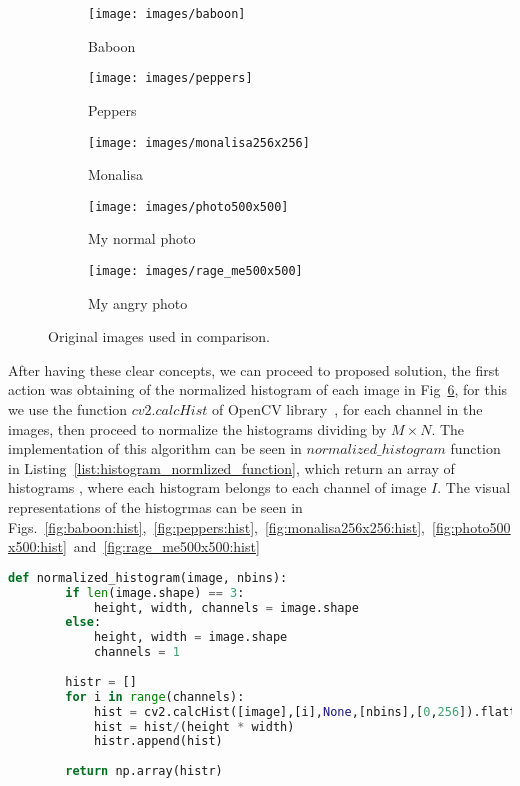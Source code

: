 \documentclass[journal]{IEEEtran}
\begin{document}
\begin{figure}
	\centering
	\begin{subfigure}{0.11\textwidth}
		\centering
		\texttt{[image: images/baboon]} 
		\caption{Baboon}
		\label{fig:baboon:original}
	\end{subfigure}
	\centering
	\begin{subfigure}{0.11\textwidth}
		\centering
		\texttt{[image: images/peppers]}
		\caption{Peppers}
		\label{fig:peppers:original}
	\end{subfigure}
	\centering
	\begin{subfigure}{0.11\textwidth}
		\centering
		\texttt{[image: images/monalisa256x256]}
		\caption{Monalisa}
		\label{fig:monalisa256x256:original}
	\end{subfigure}
	\centering
	\begin{subfigure}{0.15\textwidth}
		\centering
		\texttt{[image: images/photo500x500]}
		\caption{My normal photo}
		\label{fig:photo500x500:original}
	\end{subfigure}
	\centering
	\begin{subfigure}{0.15\textwidth}
		\centering
		\texttt{[image: images/rage\_me500x500]}
		\caption{My angry photo}
		\label{fig:rage_me500x500:original}
	\end{subfigure}
	
	\caption{Original images used in comparison.}
	\label{fig:originals}
\end{figure}

After having these clear concepts, we can proceed to proposed solution, the first action was obtaining of the normalized histogram of each image in Fig~\ref{fig:originals}, for this we use the function  $cv2.calcHist$ of OpenCV library~\cite{Bradski2000}, for each channel in the images, then proceed to normalize the histograms dividing by $M \times N$. The implementation of this algorithm can be seen in $normalized\_histogram$ function in Listing~\ref{list:histogram_normlized_function}, which return an array of histograms , where each histogram belongs to each channel of image $I$. The visual representations of the histogrmas can be seen in Figs.~\ref{fig:baboon:hist},~\ref{fig:peppers:hist},~\ref{fig:monalisa256x256:hist},~\ref{fig:photo500x500:hist}~and~\ref{fig:rage_me500x500:hist}

	\begin{lstlisting}[language=Python, caption=Histogram function, label=list:histogram_normlized_function]
	def normalized_histogram(image, nbins):
		if len(image.shape) == 3:
			height, width, channels = image.shape
		else:
			height, width = image.shape
			channels = 1
		
		histr = []
		for i in range(channels):
			hist = cv2.calcHist([image],[i],None,[nbins],[0,256]).flatten()
			hist = hist/(height * width)
			histr.append(hist)
		
		return np.array(histr)
	\end{lstlisting}
\end{document}
